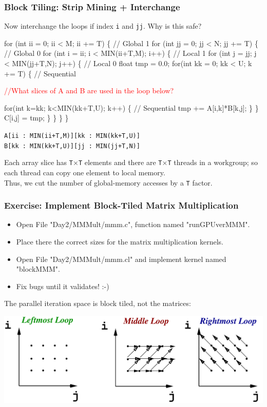 \documentclass{beamer}
\newcommand{\red}[1]{\textcolor{Red}{{#1}}}
\renewcommand{\emph}[1]{\textcolor{CosGreen}{ #1}}
\newcommand{\emp}[1]{\textcolor{DikuRed}{ #1}}
\newcommand{\emphh}[1]{\textcolor{CosGreen}{ #1}}
\begin{document}
\begin{frame}[fragile,t]
  \frametitle{Block Tiling: Strip Mining + Interchange}

\emph{Now interchange the loops if index {\tt i} and {\tt jj}.} Why is this safe?\smallskip

\begin{colorcode}[fontsize=\scriptsize]
for (int ii = 0; ii < M; ii += T) \{             \emp{// Global 1}
  for (int jj = 0; jj < N; jj += T) \{           \emp{// Global 0}
    for (int i = ii; i < MIN(ii+T,M); i++) \{    \emphh{// Local 1}
      for (int j = jj; j < MIN(jj+T,N); j++) \{  \emphh{// Local 0}
          float tmp = 0.0;
          for(int kk = 0; kk < U; k += T) \{     \emp{// Sequential}

            \red{//What slices of A and B are used in the loop below?}

            for(int k=kk; k<MIN(kk+T,U); k++) \{ \emp{// Sequential}
                tmp += A[i,k]*B[k,j];
            \}
          \}
          C[i,j] = tmp;          
\} \} \} \}
\end{colorcode}

\pause

\emph{\tt A[ii : MIN(ii+T,M)][kk : MIN(kk+T,U)]}\\
\emph{\tt B[kk : MIN(kk+T,U)][jj : MIN(jj+T,N)]}\\\smallskip

Each array slice has {\tt T$\times$T} elements and there are {\tt T$\times$T} threads in a workgroup;
so each thread can copy one element to local memory.\\  
Thus, we cut the number of global-memory accesses by a {\tt T} factor.

\end{frame}

\begin{frame}[fragile,t]
  \frametitle{Exercise: Implement Block-Tiled Matrix Multiplication}

\begin{itemize}
    \item Open File "Day2/MMMult/mmm.c", function named "runGPUverMMM".
    \item Place there the correct sizes for the matrix multiplication kernels.
    \item Open File "Day2/MMMult/mmm.cl" and implement kernel named "blockMMM".
    \item Fix bugs until it validates! :-)
\end{itemize}

\pause
The parallel iteration space is block tiled, not the matrices:

\hspace{-5ex}\includegraphics[height=20ex]{img/day2/LoopDeps} 


\end{frame}
\end{document}
